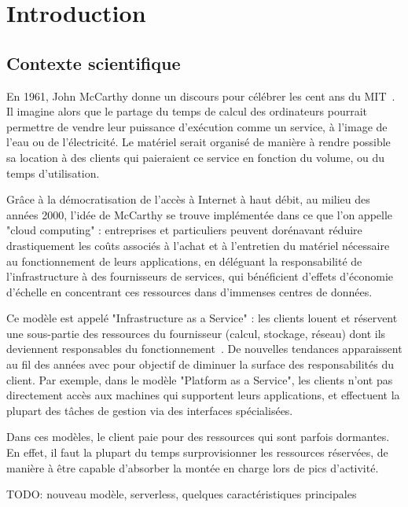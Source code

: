 \chapter{Introduction}

\section{Contexte scientifique}

En 1961, John McCarthy donne un discours pour célébrer les cent ans du MIT~\cite{greenberger1962management}. Il imagine alors que le partage du temps de calcul des ordinateurs pourrait permettre de vendre leur puissance d'exécution comme un service, à l'image de l'eau ou de l'électricité. Le matériel serait organisé de manière à rendre possible sa location à des clients qui paieraient ce service en fonction du volume, ou du temps d'utilisation.

Grâce à la démocratisation de l'accès à Internet à haut débit, au milieu des années 2000, l'idée de McCarthy se trouve implémentée dans ce que l'on appelle "cloud computing" : entreprises et particuliers peuvent dorénavant réduire drastiquement les coûts associés à l'achat et à l'entretien du matériel nécessaire au fonctionnement de leurs applications, en déléguant la responsabilité de l'infrastructure à des fournisseurs de services, qui bénéficient d'effets d'économie d'échelle en concentrant ces ressources dans d'immenses centres de données.

Ce modèle est appelé "Infrastructure as a Service" : les clients louent et réservent une sous-partie des ressources du fournisseur (calcul, stockage, réseau) dont ils deviennent responsables du fonctionnement~\cite{mellNISTDefinitionCloud}. De nouvelles tendances apparaissent au fil des années avec pour objectif de diminuer la surface des responsabilités du client. Par exemple, dans le modèle "Platform as a Service", les clients n'ont pas directement accès aux machines qui supportent leurs applications, et effectuent la plupart des tâches de gestion via des interfaces spécialisées.

Dans ces modèles, le client paie pour des ressources qui sont parfois dormantes. En effet, il faut la plupart du temps surprovisionner les ressources réservées, de manière à être capable d'absorber la montée en charge lors de pics d'activité.

TODO: nouveau modèle, serverless, quelques caractéristiques principales


